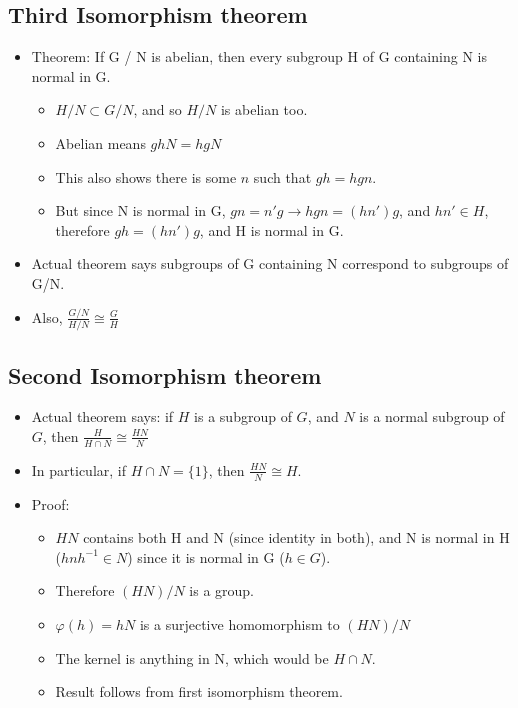 \documentclass[11pt, oneside]{article}   	%
\begin{document}
\subsection{Third Isomorphism theorem}
\begin{itemize}
\item Theorem: If G / N is abelian, then every subgroup H of G containing N is normal in G.
  \begin{itemize}
\item $H / N \subset G / N$, and so $H / N$ is abelian too.
\item Abelian means $ghN = hgN$
\item This also shows there is some $n$ such that $gh = hgn$.
\item But since N is normal in G, $gn = n'g \rightarrow hgn = (hn')g$, and $hn' \in H$, therefore $gh = (hn')g$, and H is normal in G.
\end{itemize}
\item Actual theorem says subgroups of G containing N correspond to subgroups of G/N. 
\item Also, $\frac{G/N}{H/N} \cong \frac{G}{H}$
\end{itemize}

\subsection{Second Isomorphism theorem}
\begin{itemize}
\item Actual theorem says: if $H$ is a subgroup of $G$, and $N$ is a normal subgroup of $G$, then $\frac{H}{H \cap N} \cong \frac{HN}{N}$
\item In particular, if $H \cap N = \{1\}$, then $\frac{HN}{N} \cong H$.  
\item Proof:  
\begin{itemize}
\item $HN$ contains both H and N (since identity in both), and N is normal in H ($hnh^{-1} \in N$) since it is normal in G ($h \in G$).
\item Therefore $(HN)/N$ is a group.
\item $\varphi(h) = hN$ is a surjective homomorphism to $(HN)/N$
\item The kernel is anything in N, which would be $H \cap N$.
\item Result follows from first isomorphism theorem.
\end{itemize}
\end{itemize}
\end{document}
